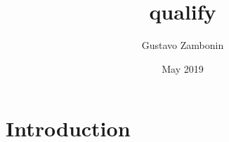 \documentclass{article}
\title{qualify}
\author{Gustavo Zambonin}
\date{May 2019}
\begin{document}
\maketitle

\section{Introduction}
\end{document}
